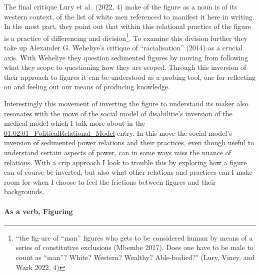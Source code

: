 The final critique Lury et al.~(2022, 4) make of the figure as a noun is
of its western context, of the list of white men referenced to manifest
it here in writing. In the most part, they point out that within this
relational practice of the figure is a practice of differencing and
division\footnote{``the fig-ure of ``man'' figures who gets to be
  considered human by means of a series of constitutive exclusions
  (Mbembe 2017). Does one have to be male to count as ``man''? White?
  Western? Wealthy? Able-bodied?" (Lury, Viney, and Wark 2022, 4)}. To
examine this division further they take up Alexander G. Weheliye's
critique of ``racialisation'' (2014) as a crucial axis. With Weheliye
they question sedimented figures by moving from following what they
scope to questioning how they are scoped. Through this inversion of
their approach to figures it can be understood as a probing tool, one
for reflecting on and feeling out our means of producing knowledge.

Interestingly this movement of inverting the figure to understand its
maker also resonates with the move of the social model of disabilitie's
inversion of the medical model which I talk more about in the
\href{../../01_Disability_justice_and_life_affirmation_flipping_the_table/sections/01.02.01_PoliticalRelational_Model.md}{01.02.01\_PoliticalRelational\_Model}
entry. In this move the social model's inversion of sedimented power
relations and their practices, even though useful to understand certain
aspects of power, can in some ways miss the nuance of relations. With a
crip approach I look to trouble this by exploring how a figure can of
course be inverted, but also what other relations and practices can I
make room for when I choose to feel the frictions between figures and
their backgrounds.

\hypertarget{as-a-verb-figuring}{%
\paragraph{As a verb, Figuring}\label{as-a-verb-figuring}}

